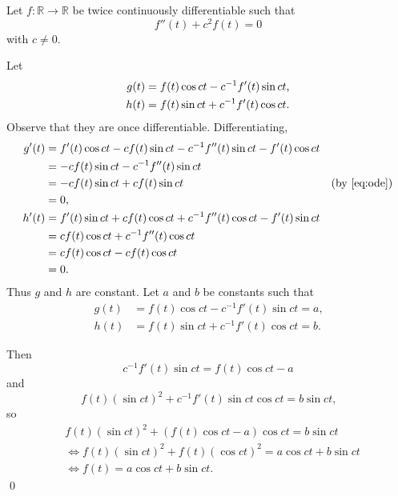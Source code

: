 \documentclass[oneside]{article}
\newcommand\bbR{\mathbb{R}}
\begin{document}
  Let $f : \bbR \to \bbR$ be twice continuously differentiable such that
  \begin{equation}
    \label{eq:ode}
    f''(t) + c^2f(t) = 0
  \end{equation} with $c \neq 0$.

  Let\begin{align*}
    g(t) &= f(t)\cos ct - c^{-1} f'(t) \sin ct \text{,}\\
    h(t) &= f(t)\sin ct + c^{-1} f'(t) \cos ct \text.
  \end{align*} Observe that they are once differentiable. Differentiating,
  \begin{align*}
    g'(t)
    &= f'(t)\cos ct - cf(t)\sin ct - c^{-1} f''(t) \sin ct - f'(t) \cos ct \\
    &= - cf(t)\sin ct - c^{-1} f''(t) \sin ct \\
    &= - cf(t)\sin ct + c f(t) \sin ct & \text{(by \eqref{eq:ode})}\\
    &= 0 \text{,} \\
    h'(t)
    &= f'(t)\sin ct + cf(t)\cos ct + c^{-1} f''(t) \cos ct - f'(t) \sin ct \\
    &= cf(t)\cos ct + c^{-1} f''(t) \cos ct \\
    &= cf(t)\cos ct - cf(t) \cos ct \\
    &= 0 \text{.}
  \end{align*} Thus $g$ and $h$ are constant. Let $a$ and $b$ be constants such
  that \begin{align*}
    g(t) &= f(t)\cos ct - c^{-1} f'(t) \sin ct = a \text{,} \\
    h(t) &= f(t)\sin ct + c^{-1} f'(t) \cos ct = b \text{.}
  \end{align*}

  Then \[
    c^{-1}f'(t)\sin ct = f(t)\cos ct - a
  \] and \[
    f(t)(\sin ct)^2 + c^{-1} f'(t) \sin ct\cos ct = b\sin ct \text{,}
  \] so \begin{align*}
    &f(t)(\sin ct)^2 + (f(t)\cos ct - a)\cos ct = b\sin ct \\
    &\iff f(t)(\sin ct)^2 + f(t)(\cos ct)^2 = a\cos ct + b\sin ct \\
    &\iff f(t) = a\cos ct + b\sin ct \text{.}
  \end{align*}\qed
\end{document}
